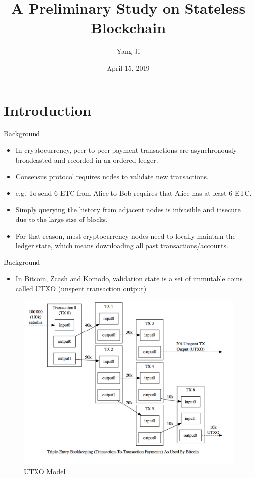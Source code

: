 \documentclass[biblatex,aspectratio=169,11pt]{mybeamer}
\title{A Preliminary Study on Stateless Blockchain}
\author{Yang Ji}
\date{April 15, 2019}
\begin{document}
\maketitle%
\PrintTOC%

\section{Introduction}

\begin{frame}{Background}
  \begin{itemize}
    \item In cryptocurrency, peer-to-peer payment transactions are asynchronously broadcasted and recorded in an ordered ledger.
    \item Consensus protocol requires nodes to validate new transactions. 
    \item e.g. To send 6 ETC from Alice to Bob requires that Alice has at least 6 ETC.
    \item Simply querying the history from adjacent nodes is infeasible and insecure due to the large size of blocks.
    \item For that reason, most cryptocurrency nodes need to locally maintain the \alert{ledger state}, which means downloading all past transactions/accounts.
  \end{itemize}
\end{frame}

\begin{frame}{Background}
  \begin{itemize}
    \item In Bitcoin, Zcash and Komodo, \alert{validation state} is a set of immutable coins called \alert{UTXO} (unspent transaction output)
  \end{itemize}
  \vspace{-1em}
  \begin{figure}
    \includegraphics[width=0.45\linewidth]{figs/utxo.png}
    \caption{UTXO Model}
  \end{figure}
\end{frame}
\end{document}
